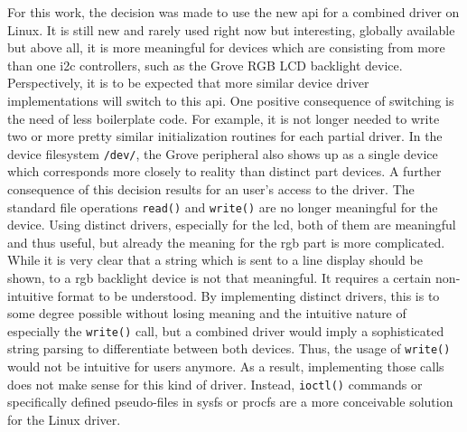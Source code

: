For this work, the decision was made to use the new \ac{api} for a combined driver on Linux.
It is still new and rarely used right now but interesting, globally available but above all, it is more meaningful for devices which are consisting from more than one \ac{i2c} controllers, such as the Grove RGB LCD backlight device.
Perspectively, it is to be expected that more similar device driver implementations will switch to this \ac{api}.
One positive consequence of switching is the need of less boilerplate code.
For example, it is not longer needed to write two or more pretty similar initialization routines for each partial driver.
In the device filesystem \texttt{/dev/}, the Grove peripheral also shows up as a single device which corresponds more closely to reality than distinct part devices.
A further consequence of this decision results for an user's access to the driver.
The standard file operations \texttt{read()} and \texttt{write()} are no longer meaningful for the device.
Using distinct drivers, especially for the \ac{lcd}, both of them are meaningful and thus useful, but already the meaning for the \ac{rgb} part is more complicated.
While it is very clear that a string which is sent to a line display should be shown, to a \ac{rgb} backlight device is not that meaningful.
It requires a certain non-intuitive format to be understood.
By implementing distinct drivers, this is to some degree possible without losing meaning and the intuitive nature of especially the \texttt{write()} call, but a combined driver would imply a sophisticated string parsing to differentiate between both devices.
Thus, the usage of \texttt{write()} would not be intuitive for users anymore.
As a result, implementing those calls does not make sense for this kind of driver.
Instead, \texttt{ioctl()} commands or specifically defined pseudo-files in sysfs or procfs are a more conceivable solution for the Linux driver.

